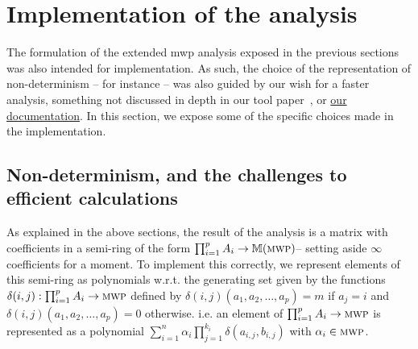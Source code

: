 \documentclass[runningheads]{llncs}
\makeatletter
\newcommand*{\ie}{i.e.\@\xspace}
\makeatother
\begin{document}
\section{Implementation of the analysis}
\label{sec:implementation}

The formulation of the extended mwp analysis exposed in the previous sections was also intended for implementation. As such, the choice of the representation of non-determinism -- for instance -- was also guided by our wish for a faster analysis, something not discussed in depth in our tool paper~\cite{Aubert2021f}, or \href{https://seiller.github.io/pymwp/}{our documentation}.
In this section, we expose some of the specific choices made in the implementation.

\subsection{Non-determinism, and the challenges to efficient calculations}

As explained in the above sections, the result of the analysis is a matrix with coefficients in a semi-ring of the form \(\prod_{i=1}^{p} A_i \rightarrow \mathbb{M}(\textsc{mwp})\)-- setting aside \(\infty\) coefficients for a moment.
To implement this correctly, we represent elements of this semi-ring as polynomials w.r.t. the generating set given by the functions \(\delta(i,j): \prod_{i=1}^{p} A_i \rightarrow {\textsc{mwp}}\) defined by \(\delta(i,j)(a_1,a_2,\dots,a_p)=m\) if \(a_j=i\) and \(\delta(i,j)(a_1,a_2,\dots,a_p)=0\) otherwise. \ie an element of \(\prod_{i=1}^{p} A_i \rightarrow {\textsc{mwp}}\) is represented as a polynomial \(\sum_{i=1}^{n} \alpha_i \prod_{j=1}^{k_i}\delta(a_{i,j},b_{i,j})\) with \(\alpha_i \in {\textsc{mwp}}\).
\end{document}
